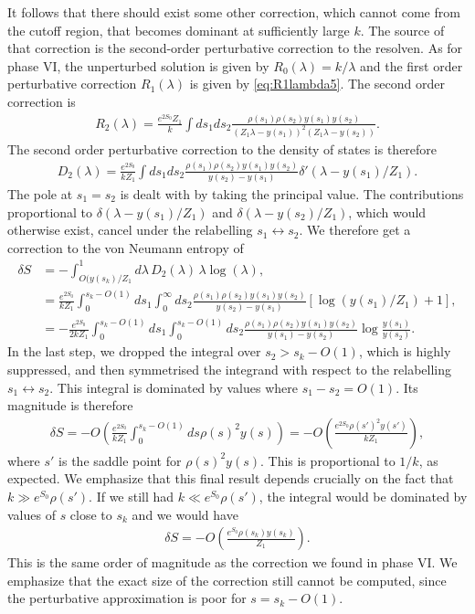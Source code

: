 \documentclass[12pt]{article}
\newcommand{\smax}{s_k}
\newcommand{\sprime}{s'}
\numberwithin{equation}{section}
\begin{document}
It follows that there should exist some other correction, which cannot come from the cutoff region, that becomes dominant at sufficiently large $k$. The source of that correction is the second-order perturbative correction to the resolven. As for phase VI, the unperturbed solution is given by $R_0(\lambda) = k/ \lambda$ and the first order perturbative correction $R_1(\lambda)$ is given by \eqref{eq:R1lambda5}. The second order correction is
\begin{align}
R_2 (\lambda) =\frac{e^{2S_0} Z_1}{k} \int ds_1 ds_2 \frac{\rho(s_1) \rho(s_2) y(s_1) y(s_2)}{(Z_1 \lambda - y(s_1))^2 (Z_1 \lambda - y(s_2))}.
\end{align}
The second order perturbative correction to the density of states is therefore
\begin{align}
D_2 (\lambda) = \frac{e^{2S_0}}{k Z_1} \int ds_1 ds_2 \frac{\rho(s_1) \rho(s_2) y(s_1) y(s_2)}{y(s_2) - y(s_1)} \delta'(\lambda - y(s_1) / Z_1).
\end{align}
The pole at $s_1 = s_2$ is dealt with by taking the principal value. The contributions proportional to $\delta(\lambda - y(s_1) / Z_1)$ and $\delta(\lambda - y(s_2) / Z_1)$, which would otherwise exist, cancel under the relabelling $s_1 \leftrightarrow s_2$. We therefore get a correction to the von Neumann entropy of
\begin{align}
\delta S &=  - \int^1_{O(y(\smax)/Z_1} d \lambda\, D_2(\lambda) \,\lambda \log(\lambda),
\\& = \frac{e^{2S_0}}{k Z_1} \int_0^{\smax - O(1)} ds_1 \int_0^\infty ds_2 \frac{\rho(s_1) \rho(s_2) y(s_1) y(s_2)}{y(s_2) - y(s_1)} [\log(y(s_1)/Z_1) + 1],
\\& = -\frac{e^{2S_0}}{2 k Z_1} \int_0^{\smax - O(1)} ds_1 \int_0^{\smax - O(1)} ds_2 \frac{\rho(s_1) \rho(s_2) y(s_1) y(s_2)}{y(s_1) - y(s_2)} \log\frac{y(s_1)}{y(s_2)}. \label{eq:vNcorrectionlargeK}
\end{align}
In the last step, we dropped the integral over $s_2 > \smax - O(1)$, which is highly suppressed, and then symmetrised the integrand with respect to the relabelling $s_1 \leftrightarrow s_2$. This integral is dominated by values where $s_1 - s_2 = O(1)$. Its magnitude is therefore
\begin{align}
\delta S = - O\left(\frac{e^{2S_0}}{k Z_1} \int_0^{\smax - O(1)} ds \rho(s)^2 y(s)\right) = -O\left(\frac{e^{2S_0} \rho(\sprime)^2 y(\sprime)}{k Z_1}\right),
\end{align}
where $\sprime$ is the saddle point for $\rho(s)^2 y(s)$. This is proportional to $1/k$, as expected. We emphasize that this final result depends crucially on the fact that $k \gg e^{S_0}\rho(\sprime)$. If we still had $k \ll e^{S_0}\rho(\sprime)$, the integral would be dominated by values of $s$ close to $\smax$ and we would have 
\begin{align}
\delta S =  -O\left(\frac{e^{S_0} \rho(\smax) y(\smax)}{ Z_1}\right).
\end{align}
 This is the same order of magnitude as the correction we found in phase VI. We emphasize that the exact size of the correction still cannot be computed, since the perturbative approximation is poor for $s = \smax- O(1)$.
\end{document}
